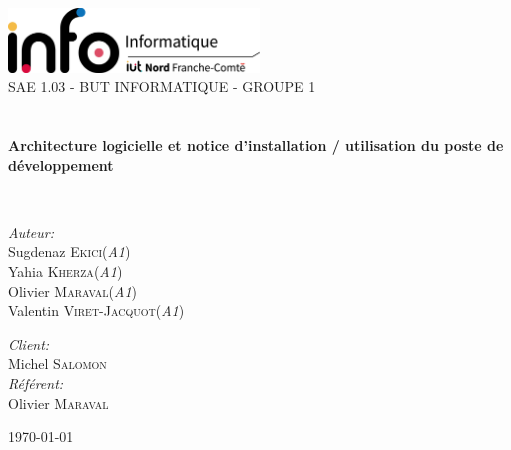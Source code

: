 \begin{titlepage}
\begin{center}

\includegraphics[width=0.5\textwidth]{./images/InfoLogoQuadriH.png}~\\[1cm]

\textsc{\LARGE SAE 1.03 - BUT INFORMATIQUE - GROUPE 1}\\[1.5cm]

\textsc{\Large }\\[0.5cm]

\HRule \\[0.4cm]

{\huge \bfseries Architecture logicielle et notice d'installation / utilisation du poste de développement\\[0.4cm] }

\HRule \\[1.5cm]

\begin{minipage}{0.4\textwidth}
\begin{flushleft} \large
\emph{Auteur:}\\
Sugdenaz \textsc{Ekici}(\textit{A1})\\
Yahia \textsc{Kherza}(\textit{A1})\\
Olivier \textsc{Maraval}(\textit{A1})\\
Valentin \textsc{Viret-Jacquot}(\textit{A1})
\end{flushleft}
\end{minipage}
\begin{minipage}{0.4\textwidth}
\begin{flushright} \large
\emph{Client:} \\
Michel \textsc{Salomon}\\
\emph{Référent:} \\
Olivier \textsc{Maraval}
\end{flushright}
\end{minipage}

\vfill

{\large \today}

\end{center}
\end{titlepage}